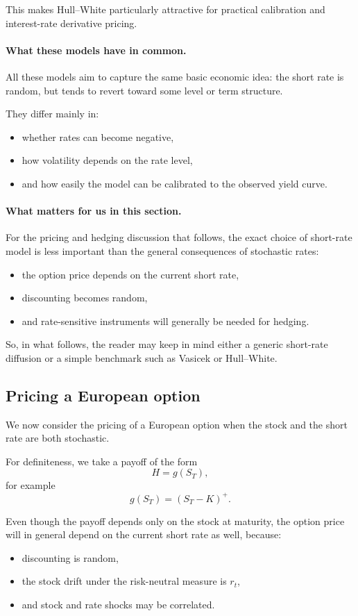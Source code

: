 \documentclass[11pt]{article}
\theoremstyle{plain}
\theoremstyle{definition}
\theoremstyle{remark}
\begin{document}
This makes Hull--White particularly attractive for practical calibration
and interest-rate derivative pricing.

\paragraph{What these models have in common.}
All these models aim to capture the same basic economic idea:
the short rate is random, but tends to revert toward some level or term
structure.

They differ mainly in:
\begin{itemize}[leftmargin=1.4em]
    \item whether rates can become negative,
    \item how volatility depends on the rate level,
    \item and how easily the model can be calibrated to the observed
    yield curve.
\end{itemize}

\paragraph{What matters for us in this section.}
For the pricing and hedging discussion that follows, the exact choice of
short-rate model is less important than the general consequences of
stochastic rates:
\begin{itemize}[leftmargin=1.4em]
    \item the option price depends on the current short rate,
    \item discounting becomes random,
    \item and rate-sensitive instruments will generally be needed for
    hedging.
\end{itemize}

So, in what follows, the reader may keep in mind either a generic
short-rate diffusion or a simple benchmark such as Vasicek or
Hull--White.

\subsection{Pricing a European option}

We now consider the pricing of a European option when the stock and the
short rate are both stochastic.

For definiteness, we take a payoff of the form
\[
H=g(S_T),
\]
for example
\[
g(S_T)=(S_T-K)^+.
\]

Even though the payoff depends only on the stock at maturity, the option
price will in general depend on the current short rate as well, because:
\begin{itemize}[leftmargin=1.4em]
    \item discounting is random,
    \item the stock drift under the risk-neutral measure is \(r_t\),
    \item and stock and rate shocks may be correlated.
\end{itemize}
\end{document}
